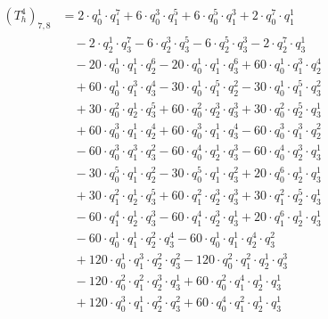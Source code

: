 \begin{align*}(T_{h}^4)_{7,8}&=2\cdot q_0^{1}\cdot q_1^{7}+6\cdot q_0^{3}\cdot q_1^{5}+6\cdot q_0^{5}\cdot q_1^{3}+2\cdot q_0^{7}\cdot q_1^{1}\\
&\quad -2\cdot q_2^{1}\cdot q_3^{7}-6\cdot q_2^{3}\cdot q_3^{5}-6\cdot q_2^{5}\cdot q_3^{3}-2\cdot q_2^{7}\cdot q_3^{1}\\
&\quad -20\cdot q_0^{1}\cdot q_1^{1}\cdot q_2^{6}-20\cdot q_0^{1}\cdot q_1^{1}\cdot q_3^{6}+60\cdot q_0^{1}\cdot q_1^{3}\cdot q_2^{4}\\
&\quad +60\cdot q_0^{1}\cdot q_1^{3}\cdot q_3^{4}-30\cdot q_0^{1}\cdot q_1^{5}\cdot q_2^{2}-30\cdot q_0^{1}\cdot q_1^{5}\cdot q_3^{2}\\
&\quad +30\cdot q_0^{2}\cdot q_2^{1}\cdot q_3^{5}+60\cdot q_0^{2}\cdot q_2^{3}\cdot q_3^{3}+30\cdot q_0^{2}\cdot q_2^{5}\cdot q_3^{1}\\
&\quad +60\cdot q_0^{3}\cdot q_1^{1}\cdot q_2^{4}+60\cdot q_0^{3}\cdot q_1^{1}\cdot q_3^{4}-60\cdot q_0^{3}\cdot q_1^{3}\cdot q_2^{2}\\
&\quad -60\cdot q_0^{3}\cdot q_1^{3}\cdot q_3^{2}-60\cdot q_0^{4}\cdot q_2^{1}\cdot q_3^{3}-60\cdot q_0^{4}\cdot q_2^{3}\cdot q_3^{1}\\
&\quad -30\cdot q_0^{5}\cdot q_1^{1}\cdot q_2^{2}-30\cdot q_0^{5}\cdot q_1^{1}\cdot q_3^{2}+20\cdot q_0^{6}\cdot q_2^{1}\cdot q_3^{1}\\
&\quad +30\cdot q_1^{2}\cdot q_2^{1}\cdot q_3^{5}+60\cdot q_1^{2}\cdot q_2^{3}\cdot q_3^{3}+30\cdot q_1^{2}\cdot q_2^{5}\cdot q_3^{1}\\
&\quad -60\cdot q_1^{4}\cdot q_2^{1}\cdot q_3^{3}-60\cdot q_1^{4}\cdot q_2^{3}\cdot q_3^{1}+20\cdot q_1^{6}\cdot q_2^{1}\cdot q_3^{1}\\
&\quad -60\cdot q_0^{1}\cdot q_1^{1}\cdot q_2^{2}\cdot q_3^{4}-60\cdot q_0^{1}\cdot q_1^{1}\cdot q_2^{4}\cdot q_3^{2}\\
&\quad +120\cdot q_0^{1}\cdot q_1^{3}\cdot q_2^{2}\cdot q_3^{2}-120\cdot q_0^{2}\cdot q_1^{2}\cdot q_2^{1}\cdot q_3^{3}\\
&\quad -120\cdot q_0^{2}\cdot q_1^{2}\cdot q_2^{3}\cdot q_3^{1}+60\cdot q_0^{2}\cdot q_1^{4}\cdot q_2^{1}\cdot q_3^{1}\\
&\quad +120\cdot q_0^{3}\cdot q_1^{1}\cdot q_2^{2}\cdot q_3^{2}+60\cdot q_0^{4}\cdot q_1^{2}\cdot q_2^{1}\cdot q_3^{1}\end{align*}
